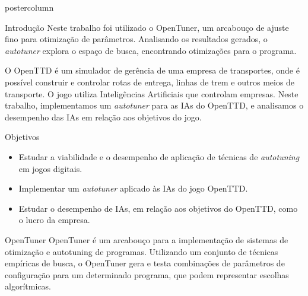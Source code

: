 \documentclass[final]{beamer}
\begin{document}
\begin{frame}
\begin{columns}
\begin{column}{.5\textwidth}
\begin{beamercolorbox}[center,wd=\textwidth]{postercolumn}
\begin{minipage}[T]{.95\textwidth}
{\begin{block}{Introdução}
                Neste trabalho foi utilizado o OpenTuner, um arcabouço de ajuste fino para otimização de parâmetros. Analisando os resultados gerados, o \textit{autotuner} explora o espaço de busca, encontrando otimizações para o programa.
                
                \vspace*{0.15cm}
                
                O OpenTTD é um simulador de gerência de uma empresa de transportes, onde é possível construir e controlar rotas de entrega, linhas de trem e outros meios de transporte. O jogo utiliza Inteligências Artificiais que controlam empresas. Neste trabalho, implementamos um \textit{autotuner} para as IAs do OpenTTD, e analisamos o desempenho das IAs em relação aos objetivos do jogo.

                
            \end{block}
            
            \vspace*{0.2cm}

            \begin{block}{Objetivos}
              \justifying
              \begin{itemize}
                \item Estudar a viabilidade e o desempenho de aplicação de técnicas de \textit{autotuning} em jogos digitais.
                \item Implementar um \textit{autotuner} aplicado às IAs do jogo OpenTTD.
                \item Estudar o desempenho de IAs, em relação aos objetivos do OpenTTD, como o lucro da empresa.
              \end{itemize}
              \vspace*{0.2cm} 
            \end{block}
            
            \vspace*{0.2cm}

            \begin{block}{OpenTuner}
            \justifying
                OpenTuner é um arcabouço para a implementação de sistemas de otimização e autotuning de programas. Utilizando um conjunto de técnicas empíricas de busca, o OpenTuner gera e testa combinações de parâmetros de configuração para um determinado programa, que podem representar escolhas algorítmicas. 
                

\end{block}}
\end{minipage}
\end{beamercolorbox}
\end{column}
\end{columns}
\end{frame}
\end{document}
